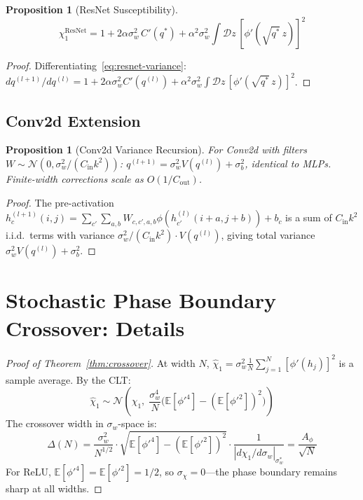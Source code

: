 \documentclass[10pt]{article}
\newcommand{\EE}{\mathbb{E}}
\newtheorem{proposition}[theorem]{Proposition}
\begin{document}
\begin{proposition}[ResNet Susceptibility]
\label{prop:resnet-chi1}
\begin{equation}
    \chi_1^{\text{ResNet}} = 1 + 2\alpha\sigma_w^2\, C'(q^*) + \alpha^2 \sigma_w^2 \int \mathcal{D}z\, [\phi'(\sqrt{q^*}\, z)]^2
\end{equation}
\end{proposition}

\begin{proof}
Differentiating~\eqref{eq:resnet-variance}:
$dq^{(l+1)}/dq^{(l)} = 1 + 2\alpha\sigma_w^2 C'(q^{(l)}) + \alpha^2 \sigma_w^2 \int \mathcal{D}z\, [\phi'(\sqrt{q^*}\, z)]^2$.
\end{proof}

\subsection{Conv2d Extension}

\begin{proposition}[Conv2d Variance Recursion]
\label{prop:conv-variance}
For Conv2d with filters $W \sim \mathcal{N}(0, \sigma_w^2/(C_{\mathrm{in}} k^2))$:
$q^{(l+1)} = \sigma_w^2 V(q^{(l)}) + \sigma_b^2$,
identical to MLPs. Finite-width corrections scale as $O(1/C_{\mathrm{out}})$.
\end{proposition}

\begin{proof}
The pre-activation $h_{c}^{(l+1)}(i,j) = \sum_{c'}\sum_{a,b} W_{c,c',a,b} \phi(h_{c'}^{(l)}(i+a, j+b)) + b_c$ is a sum of $C_{\mathrm{in}} k^2$ i.i.d.\ terms with variance $\sigma_w^2/(C_{\mathrm{in}} k^2) \cdot V(q^{(l)})$, giving total variance $\sigma_w^2 V(q^{(l)}) + \sigma_b^2$.
\end{proof}

\section{Stochastic Phase Boundary Crossover: Details}
\label{app:crossover-detail}

\begin{proof}[Proof of Theorem~\ref{thm:crossover}]
At width $N$, $\hat{\chi}_1 = \sigma_w^2 \frac{1}{N}\sum_{j=1}^N [\phi'(h_j)]^2$ is a sample average.
By the CLT:
\begin{equation}
    \hat{\chi}_1 \sim \mathcal{N}\!\left(\chi_1,\; \frac{\sigma_w^4}{N}\bigl(\EE[\phi'^4] - (\EE[\phi'^2])^2\bigr)\right)
\end{equation}
The crossover width in $\sigma_w$-space is:
\begin{equation}
    \Delta(N) = \frac{\sigma_w^2}{N^{1/2}} \cdot \sqrt{\EE[\phi'^4] - (\EE[\phi'^2])^2} \cdot \frac{1}{|d\chi_1/d\sigma_w|_{\sigma_w^*}} = \frac{A_\phi}{\sqrt{N}}
\end{equation}
For ReLU, $\EE[\phi'^4] = \EE[\phi'^2] = 1/2$, so $\sigma_\chi = 0$---the phase boundary remains sharp at all widths.
\end{proof}
\end{document}
